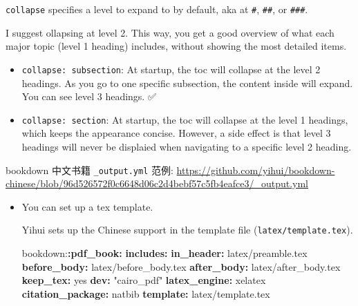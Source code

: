 \documentclass[
  a4paper,
  twoside,
  openright]{book}
\newenvironment{Shaded}{\begin{snugshade}}{\end{snugshade}}
\newcommand{\AttributeTok}[1]{\textcolor[rgb]{0.13,0.29,0.53}{#1}}
\newcommand{\CharTok}[1]{\textcolor[rgb]{0.31,0.60,0.02}{#1}}
\newcommand{\FunctionTok}[1]{\textcolor[rgb]{0.13,0.29,0.53}{\textbf{#1}}}
\newcommand{\KeywordTok}[1]{\textcolor[rgb]{0.13,0.29,0.53}{\textbf{#1}}}
\newcommand{\StringTok}[1]{\textcolor[rgb]{0.31,0.60,0.02}{#1}}
\providecommand{\tightlist}{%
  \setlength{\itemsep}{0pt}\setlength{\parskip}{0pt}}
\theoremstyle{definition}
\theoremstyle{definition}
\theoremstyle{definition}
\theoremstyle{definition}
\theoremstyle{remark}
\begin{document}
\begin{itemize}
  \texttt{collapse} specifies a level to expand to by default, aka at \texttt{\#}, \texttt{\#\#}, or \texttt{\#\#\#}.

  I suggest ollapsing at level 2. This way, you get a good overview of what each major topic (level 1 heading) includes, without showing the most detailed items.

  \begin{itemize}
  \tightlist
  \item
    \texttt{collapse:\ subsection}: At startup, the toc will collapse at the level 2 headings. As you go to one specific subsection, the content inside will expand. You can see level 3 headings. ✅
  \item
    \texttt{collapse:\ section}: At startup, the toc will collapse at the level 1 headings, which keeps the appearance concise. However, a side effect is that level 3 headings will never be displaied when navigating to a specific level 2 heading.
  \end{itemize}
\end{itemize}

bookdown 中文书籍 \texttt{\_output.yml} 范例: \url{https://github.com/yihui/bookdown-chinese/blob/96d526572f0c6648d06c2d4bebf57c5fb4eafce3/_output.yml}

\begin{itemize}
\item
  You can set up a tex template.

  Yihui sets up the Chinese support in the template file (\texttt{latex/template.tex}).

\begin{Shaded}
\begin{Highlighting}[]
\AttributeTok{bookdown:}\FunctionTok{:pdf\_book}\KeywordTok{:}
\AttributeTok{  }\FunctionTok{includes}\KeywordTok{:}
\AttributeTok{    }\FunctionTok{in\_header}\KeywordTok{:}\AttributeTok{ latex/preamble.tex}
\AttributeTok{    }\FunctionTok{before\_body}\KeywordTok{:}\AttributeTok{ latex/before\_body.tex}
\AttributeTok{    }\FunctionTok{after\_body}\KeywordTok{:}\AttributeTok{ latex/after\_body.tex}
\AttributeTok{  }\FunctionTok{keep\_tex}\KeywordTok{:}\AttributeTok{ }\CharTok{yes}
\AttributeTok{  }\FunctionTok{dev}\KeywordTok{:}\AttributeTok{ }\StringTok{"cairo\_pdf"}
\AttributeTok{  }\FunctionTok{latex\_engine}\KeywordTok{:}\AttributeTok{ xelatex}
\AttributeTok{  }\FunctionTok{citation\_package}\KeywordTok{:}\AttributeTok{ natbib}
\AttributeTok{  }\FunctionTok{template}\KeywordTok{:}\AttributeTok{ latex/template.tex}
\end{Highlighting}
\end{Shaded}
\end{itemize}
\end{document}
